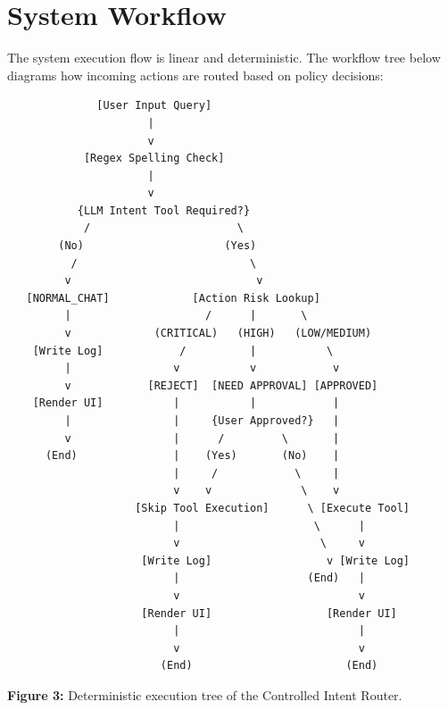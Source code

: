 \documentclass{article}
\begin{document}
\section{System Workflow}

The system execution flow is linear and deterministic. The workflow tree below diagrams how incoming actions are routed based on policy decisions:

\begin{verbatim}
              [User Input Query]
                      |
                      v
            [Regex Spelling Check]
                      |
                      v
           {LLM Intent Tool Required?}
            /                       \
        (No)                      (Yes)
          /                           \
         v                             v
   [NORMAL_CHAT]             [Action Risk Lookup]
         |                     /      |       \
         v             (CRITICAL)   (HIGH)   (LOW/MEDIUM)
    [Write Log]            /          |           \
         |                v           v            v
         v            [REJECT]  [NEED APPROVAL] [APPROVED]
    [Render UI]           |           |            |
         |                |     {User Approved?}   |
         v                |      /         \       |
      (End)               |    (Yes)       (No)    |
                          |     /            \     |
                          v    v              \    v
                    [Skip Tool Execution]      \ [Execute Tool]
                          |                     \      |
                          v                      \     v
                     [Write Log]                  v [Write Log]
                          |                    (End)   |
                          v                            v
                     [Render UI]                  [Render UI]
                          |                            |
                          v                            v
                        (End)                        (End)
\end{verbatim}
\begin{center}
\small \textbf{Figure 3:} Deterministic execution tree of the Controlled Intent Router.
\end{center}
\end{document}
